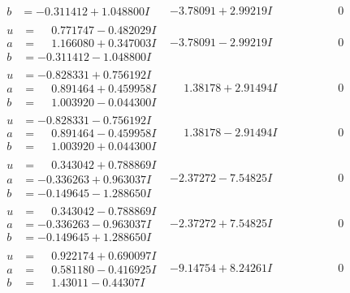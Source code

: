 \documentclass[1p]{elsarticle_modified}
\theoremstyle{definition}
\begin{document}
$$\begin{array}{c|c|c}
\begin{aligned}
b &= -0.311412 + 1.048800 I\end{aligned}
 & -3.78091 + 2.99219 I & \phantom{-0.000000 } 0 \\ \hline\begin{aligned}
u &= \phantom{-}0.771747 - 0.482029 I \\
a &= \phantom{-}1.166080 + 0.347003 I \\
b &= -0.311412 - 1.048800 I\end{aligned}
 & -3.78091 - 2.99219 I & \phantom{-0.000000 } 0 \\ \hline\begin{aligned}
u &= -0.828331 + 0.756192 I \\
a &= \phantom{-}0.891464 + 0.459958 I \\
b &= \phantom{-}1.003920 - 0.044300 I\end{aligned}
 & \phantom{-}1.38178 + 2.91494 I & \phantom{-0.000000 } 0 \\ \hline\begin{aligned}
u &= -0.828331 - 0.756192 I \\
a &= \phantom{-}0.891464 - 0.459958 I \\
b &= \phantom{-}1.003920 + 0.044300 I\end{aligned}
 & \phantom{-}1.38178 - 2.91494 I & \phantom{-0.000000 } 0 \\ \hline\begin{aligned}
u &= \phantom{-}0.343042 + 0.788869 I \\
a &= -0.336263 + 0.963037 I \\
b &= -0.149645 - 1.288650 I\end{aligned}
 & -2.37272 - 7.54825 I & \phantom{-0.000000 } 0 \\ \hline\begin{aligned}
u &= \phantom{-}0.343042 - 0.788869 I \\
a &= -0.336263 - 0.963037 I \\
b &= -0.149645 + 1.288650 I\end{aligned}
 & -2.37272 + 7.54825 I & \phantom{-0.000000 } 0 \\ \hline\begin{aligned}
u &= \phantom{-}0.922174 + 0.690097 I \\
a &= \phantom{-}0.581180 - 0.416925 I \\
b &= \phantom{-}1.43011 - 0.44307 I\end{aligned}
 & -9.14754 + 8.24261 I & \phantom{-0.000000 } 0 \\ \hline\begin{aligned}

\end{aligned}
\end{array}$$
\end{document}
